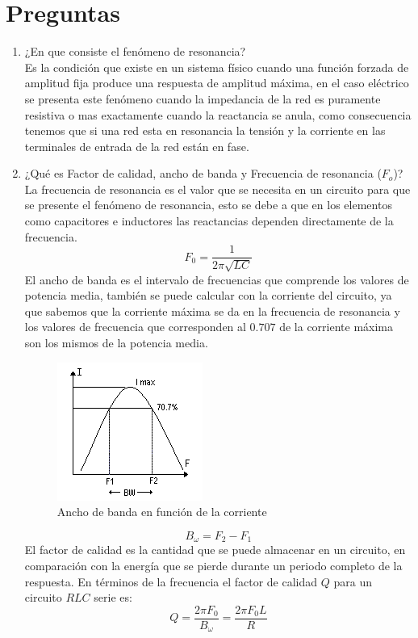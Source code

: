 \documentclass[twocolumn]{IEEEtran}
\begin{document}
\section{Preguntas}
\begin{enumerate}
 \item ¿En que consiste el fenómeno de resonancia?\\
Es la condición que existe en un sistema físico cuando una función forzada de amplitud fija produce una respuesta de amplitud máxima, en el caso eléctrico se presenta este fenómeno cuando la impedancia de la red es puramente resistiva o mas exactamente cuando la reactancia se anula, como consecuencia tenemos que si una red esta en resonancia la tensión y la corriente en las terminales de entrada de la red están en fase.

 \item ¿Qué es Factor de calidad, ancho de banda y Frecuencia de resonancia ($F_o$)?\\
La frecuencia de resonancia es el valor que se necesita en un circuito para que se presente el fenómeno de resonancia, esto se debe a que en los elementos como capacitores e inductores las reactancias dependen directamente de la frecuencia.
\begin{equation}
 {F_0} = \frac{1}{{2\pi \sqrt {LC} }}
\label{ecu50}
\end{equation}
\noindent
El ancho de banda es el intervalo de frecuencias que comprende los valores de potencia media, también se puede calcular con la corriente del circuito, ya que sabemos que la corriente máxima se da en la frecuencia de resonancia y los valores de frecuencia que corresponden al $0.707$ de la corriente máxima son los mismos de la potencia media.
\begin{figure}[H]
	\centering
		\includegraphics[scale=0.7]{figura1.png}
	\caption{Ancho de banda en función de la corriente}
	\label{figura1}
\end{figure}
\begin{equation}
 {B_\omega } = {F_2} - {F_1}
\label{ecu51}
\end{equation}
\noindent
El factor de calidad es la cantidad que se puede almacenar en un circuito, en comparación con la energía que se pierde durante un periodo completo de la respuesta. En términos de la frecuencia el factor de calidad $Q$ para un circuito $RLC$ serie es:
\begin{equation}
 Q = \frac{{2\pi {F_0}}}{{{B_\omega }}} = \frac{{2\pi {F_0}L}}{R}
\label{ecu52}
\end{equation}


\end{enumerate}
\end{document}
